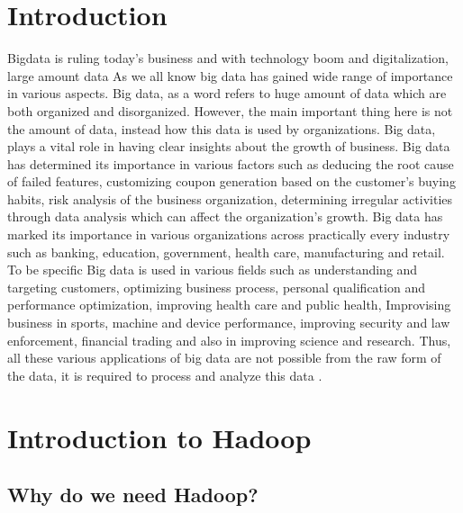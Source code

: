

\maketitle

\section{Introduction}

Bigdata is ruling today's business and with technology boom and digitalization, 
large amount data As we all know big data has gained wide range of importance in
various aspects. Big data, as a word refers to huge amount of data which are 
both organized and disorganized. However, the main important thing here is not
the amount of data, instead how this data is used by organizations. Big data,
plays a vital role in having clear insights about the growth of business.
Big data has determined its importance in various factors such as deducing the 
root cause of failed features, customizing coupon generation based on the 
customer’s buying habits, risk analysis of the business organization, 
determining irregular activities through data analysis which can affect the 
organization’s growth. Big data has marked its importance in various 
organizations across practically every industry such as banking, education, 
government, health care, manufacturing and retail. To be specific  Big data is 
used in various fields such as understanding and targeting customers, optimizing
business process, personal qualification and performance optimization, 
improving health care and public health, Improvising business in sports, 
machine and device performance, improving security and law enforcement,  
financial trading and also in improving science and research. Thus, all these 
various applications of big data are not possible from the raw form of the 
data, it is required to process and analyze this data
\cite{hid-sp18-406-hadoop-abstract}.

\section{Introduction to Hadoop}

\subsection{Why do we need Hadoop?}

